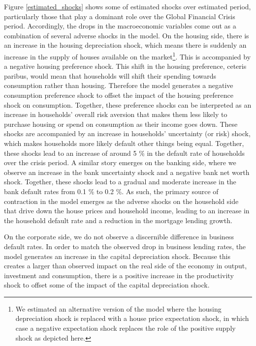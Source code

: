 \documentclass[12pt]{article}
\numberwithin{equation}{section}
\begin{document}
Figure \ref{estimated_shocks} shows some of estimated shocks over estimated period, particularly those that play a dominant role over the Global Financial Crisis period. Accordingly, the drops in the macroeconomic variables come out as a combination of several adverse shocks in the model. On the housing side, there is an increase in the housing depreciation shock, which means there is suddenly an increase in the supply of houses available on the market\footnote{We estimated an alternative version of the model where the housing depreciation shock is replaced with a house price expectation shock, in which case a negative expectation shock replaces the role of the positive supply shock as depicted here.}. This is accompanied by a negative housing preference shock. This shift in the housing preference, ceteris paribus, would mean that households will shift their spending towards consumption rather than housing. Therefore the model generates a negative consumption preference shock to offset the impact of the housing preference shock on consumption. Together, these preference shocks can be interpreted as an increase in households' overall risk aversion that makes them less likely to purchase housing or spend on consumption as their income goes down. These shocks are accompanied by an increase in households' uncertainty (or risk) shock, which makes households more likely default other things being equal. Together, these shocks lead to an increase of around 5 \% in the default rate of households over the crisis period. A similar story emerges on the banking side, where we observe an increase in the bank uncertainty shock and a negative bank net worth shock. Together, these shocks lead to a gradual and moderate increase in the bank default rates from  0.1 \% to 0.2 \%. As such, the primary source of contraction in the model emerges as the adverse shocks on the household side that drive down the house prices and household income, leading to an increase in the household default rate and a reduction in the mortgage lending growth.

On the corporate side, we do not observe a discernible difference in business default rates. In order to match the observed drop in business lending rates, the model generates an increase in the capital depreciation shock. Because this creates a larger than observed impact on the real side of the economy in output, investment and consumption, there is a positive increase in the productivity shock to offset some of the impact of the capital depreciation shock. 
\end{document}
